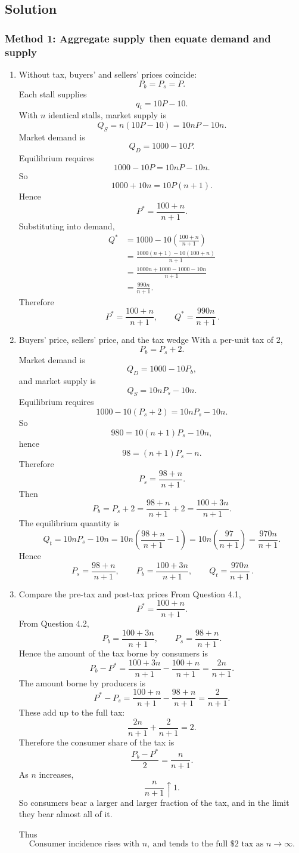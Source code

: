 \documentclass[12pt]{article}
\begin{document}
\subsection{Solution}

\subsubsection{Method 1: Aggregate supply then equate demand and supply}
\begin{enumerate}[label=(\alph*)]
    \item Without tax, buyers' and sellers' prices coincide:
\[
P_b=P_s=P.
\]
Each stall supplies
\[
q_i=10P-10.
\]
With \(n\) identical stalls, market supply is
\[
Q_S=n(10P-10)=10nP-10n.
\]
Market demand is
\[
Q_D=1000-10P.
\]
Equilibrium requires
\[
1000-10P=10nP-10n.
\]
So
\[
1000+10n=10P(n+1).
\]
Hence
\[
P^*=\frac{100+n}{n+1}.
\]
Substituting into demand,
\begin{align*}
Q^*
&=1000-10\left(\frac{100+n}{n+1}\right)\\
&=\frac{1000(n+1)-10(100+n)}{n+1}\\
&=\frac{1000n+1000-1000-10n}{n+1}\\
&=\frac{990n}{n+1}.
\end{align*}
Therefore
\[
\boxed{\,P^*=\frac{100+n}{n+1},\qquad Q^*=\frac{990n}{n+1}\,.}
\]


    \item Buyers' price, sellers' price, and the tax wedge
With a per-unit tax of \(2\),
\[
P_b=P_s+2.
\]
Market demand is
\[
Q_D=1000-10P_b,
\]
and market supply is
\[
Q_S=10nP_s-10n.
\]
Equilibrium requires
\[
1000-10(P_s+2)=10nP_s-10n.
\]
So
\[
980=10(n+1)P_s-10n,
\]
hence
\[
98=(n+1)P_s-n.
\]
Therefore
\[
P_s=\frac{98+n}{n+1}.
\]
Then
\[
P_b=P_s+2
=\frac{98+n}{n+1}+2
=\frac{100+3n}{n+1}.
\]
The equilibrium quantity is
\[
Q_t=10nP_s-10n
=10n\left(\frac{98+n}{n+1}-1\right)
=10n\left(\frac{97}{n+1}\right)
=\frac{970n}{n+1}.
\]
Hence
\[
\boxed{\,P_s=\frac{98+n}{n+1},\qquad P_b=\frac{100+3n}{n+1},\qquad Q_t=\frac{970n}{n+1}\,.}
\]


    \item Compare the pre-tax and post-tax prices
From Question 4.1,
\[
P^*=\frac{100+n}{n+1}.
\]
From Question 4.2,
\[
P_b=\frac{100+3n}{n+1},
\qquad
P_s=\frac{98+n}{n+1}.
\]
Hence the amount of the tax borne by consumers is
\[
P_b-P^*
=\frac{100+3n}{n+1}-\frac{100+n}{n+1}
=\frac{2n}{n+1}.
\]
The amount borne by producers is
\[
P^*-P_s
=\frac{100+n}{n+1}-\frac{98+n}{n+1}
=\frac{2}{n+1}.
\]
These add up to the full tax:
\[
\frac{2n}{n+1}+\frac{2}{n+1}=2.
\]
Therefore the consumer share of the tax is
\[
\frac{P_b-P^*}{2}=\frac{n}{n+1}.
\]
As \(n\) increases,
\[
\frac{n}{n+1}\uparrow 1.
\]
So consumers bear a larger and larger fraction of the tax, and in the limit they bear almost all of it.

Thus
\[
\boxed{\,\text{Consumer incidence rises with }n,\ \text{and tends to the full \$2 tax as }n\to\infty.\,}
\]
\end{enumerate}
\end{document}
